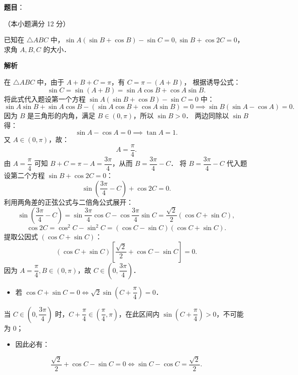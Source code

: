 \begin{answer}

\textbf{题目}：

（本小题满分 12 分）

已知在 $\triangle ABC$ 中，$\sin A(\sin B + \cos B) - \sin C = 0, \sin B + \cos 2C = 0$，求角 $A, B, C$ 的大小．

\textbf{解析}

在 $\triangle ABC$ 中，由于 $A + B + C = \pi$，有 $C = \pi - (A + B)$，
根据诱导公式：
\nopagebreak[4]
\[
\sin C = \sin(A + B) = \sin A \cos B + \cos A \sin B.
\]
将此式代入题设第一个方程 $\sin A(\sin B + \cos B) - \sin C = 0$ 中：
\nopagebreak[4]
\[
\sin A \sin B + \sin A \cos B - (\sin A \cos B + \cos A \sin B) = 0 \implies \sin B(\sin A - \cos A) = 0.
\]
因为 $B$ 是三角形的内角，满足 $B \in (0, \pi)$，所以 $\sin B > 0$．
两边同除以 $\sin B$ 得：
\nopagebreak[4]
\[
\sin A - \cos A = 0 \implies \tan A = 1.
\]
又 $A \in (0, \pi)$，故：
\nopagebreak[4]
\[
A = \frac{\pi}{4}.
\]
由 $A = \dfrac{\pi}{4}$ 可知 $B + C = \pi - A = \dfrac{3\pi}{4}$，从而 $B = \dfrac{3\pi}{4} - C$．
将 $B = \dfrac{3\pi}{4} - C$ 代入题设第二个方程 $\sin B + \cos 2C = 0$：
\nopagebreak[4]
\[
\sin\left(\frac{3\pi}{4} - C\right) + \cos 2C = 0.
\]
利用两角差的正弦公式与二倍角公式展开：
\nopagebreak[4]
\[
\sin\left(\frac{3\pi}{4} - C\right) = \sin\frac{3\pi}{4}\cos C - \cos\frac{3\pi}{4}\sin C = \frac{\sqrt{2}}{2}(\cos C + \sin C),
\]
\nopagebreak[4]
\[
\cos 2C = \cos^2 C - \sin^2 C = (\cos C - \sin C)(\cos C + \sin C).
\]
提取公因式 $(\cos C + \sin C)$：
\nopagebreak[4]
\[
(\cos C + \sin C)\left[\frac{\sqrt{2}}{2} + \cos C - \sin C\right] = 0.
\]
因为 $A = \dfrac{\pi}{4}, B \in (0, \pi)$，故 $C \in \left(0, \dfrac{3\pi}{4}\right)$．
\begin{itemize}
\item 若 $\cos C + \sin C = 0 \iff \sqrt{2}\sin\left(C + \dfrac{\pi}{4}\right) = 0$．
\end{itemize}
  当 $C \in \left(0, \dfrac{3\pi}{4}\right)$ 时，$C + \dfrac{\pi}{4} \in \left(\dfrac{\pi}{4}, \pi\right)$，在此区间内 $\sin\left(C + \dfrac{\pi}{4}\right) > 0$，不可能为 0；
\begin{itemize}
\item 因此必有：
\end{itemize}
\nopagebreak[4]
\[
\frac{\sqrt{2}}{2} + \cos C - \sin C = 0 \iff \sin C - \cos C = \frac{\sqrt{2}}{2}.
\]
\end{answer}
